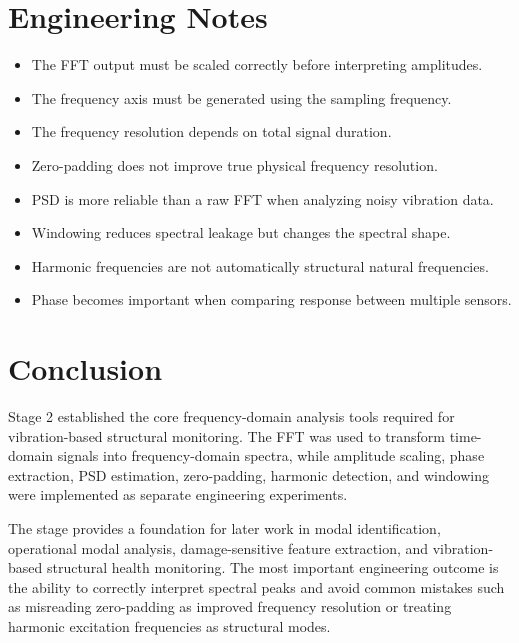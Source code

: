 \documentclass[11pt,a4paper]{article}
\begin{document}
\section{Engineering Notes}

\begin{itemize}
    \item The FFT output must be scaled correctly before interpreting amplitudes.
    \item The frequency axis must be generated using the sampling frequency.
    \item The frequency resolution depends on total signal duration.
    \item Zero-padding does not improve true physical frequency resolution.
    \item PSD is more reliable than a raw FFT when analyzing noisy vibration data.
    \item Windowing reduces spectral leakage but changes the spectral shape.
    \item Harmonic frequencies are not automatically structural natural frequencies.
    \item Phase becomes important when comparing response between multiple sensors.
\end{itemize}

\section{Conclusion}

Stage 2 established the core frequency-domain analysis tools required for vibration-based structural monitoring. The FFT was used to transform time-domain signals into frequency-domain spectra, while amplitude scaling, phase extraction, PSD estimation, zero-padding, harmonic detection, and windowing were implemented as separate engineering experiments.

The stage provides a foundation for later work in modal identification, operational modal analysis, damage-sensitive feature extraction, and vibration-based structural health monitoring. The most important engineering outcome is the ability to correctly interpret spectral peaks and avoid common mistakes such as misreading zero-padding as improved frequency resolution or treating harmonic excitation frequencies as structural modes.
\end{document}

